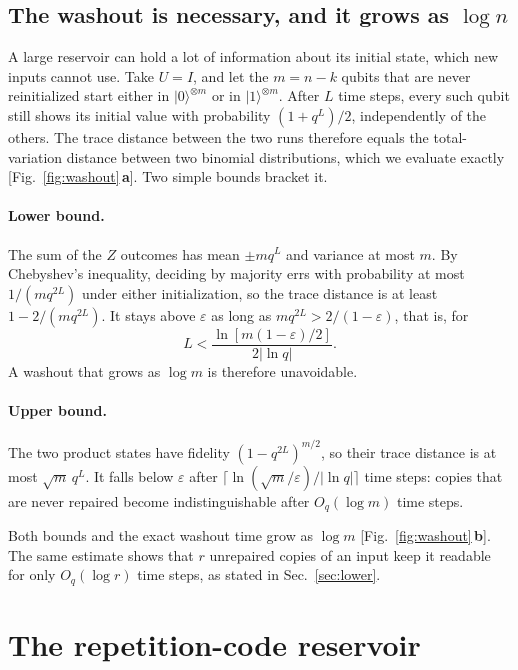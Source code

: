 \documentclass[aps,pra,reprint,superscriptaddress,floatfix]{revtex4-2}
\theoremstyle{plain}
\newcommand{\ket}[1]{|#1\rangle}
\newcommand{\pnl}[1]{\textsf{\textbf{#1}}}
\begin{document}
\subsection{The washout is necessary, and it grows as \texorpdfstring{$\log n$}{log n}}
\label{app:washoutlogn}

A large reservoir can hold a lot of information about its initial state, which new inputs cannot use. Take $U=I$, and let the $m=n-k$ qubits that are never reinitialized start either in $\ket0^{\otimes m}$ or in $\ket1^{\otimes m}$. After $L$ time steps, every such qubit still shows its initial value with probability $(1+q^L)/2$, independently of the others. The trace distance between the two runs therefore equals the total-variation distance between two binomial distributions, which we evaluate exactly [Fig.~\ref{fig:washout}\,\pnl{a}]. Two simple bounds bracket it.

\paragraph*{Lower bound.} The sum of the $Z$ outcomes has mean $\pm mq^L$ and variance at most $m$. By Chebyshev's inequality, deciding by majority errs with probability at most $1/(mq^{2L})$ under either initialization, so the trace distance is at least $1-2/(mq^{2L})$. It stays above $\varepsilon$ as long as $mq^{2L}>2/(1-\varepsilon)$, that is, for
\begin{equation}
L<\frac{\ln[m(1-\varepsilon)/2]}{2|\ln q|}.
\end{equation}
A washout that grows as $\log m$ is therefore unavoidable.

\paragraph*{Upper bound.} The two product states have fidelity $(1-q^{2L})^{m/2}$, so their trace distance is at most $\sqrt m\,q^L$. It falls below $\varepsilon$ after $\lceil\ln(\sqrt m/\varepsilon)/|\ln q|\rceil$ time steps: copies that are never repaired become indistinguishable after $O_q(\log m)$ time steps.

Both bounds and the exact washout time grow as $\log m$ [Fig.~\ref{fig:washout}\,\pnl{b}]. The same estimate shows that $r$ unrepaired copies of an input keep it readable for only $O_q(\log r)$ time steps, as stated in Sec.~\ref{sec:lower}.

\section{The repetition-code reservoir}
\label{app:lower}
\end{document}
